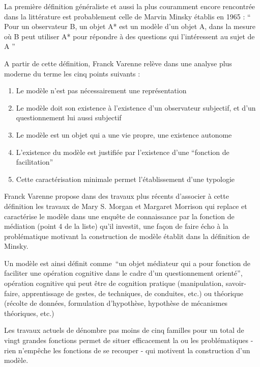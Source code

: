 La première définition généraliste et aussi la plus couramment encore rencontrée dans la littérature est probablement celle de Marvin Minsky établis en 1965 \autocite{Varenne2008} \autocite[15]{Varenne2013}  : \enquote{ Pour un observateur B, un objet A* est un modèle d’un objet A, dans la mesure où B peut utiliser A* pour répondre à des questions qui l’intéressent au sujet de A } \autocite{Minsky1965}

A partir de cette définition, Franck Varenne \autocite{Varenne2008} relève dans une analyse plus moderne du terme les cinq points suivants : 
\begin{enumerate}
  \item Le modèle n'est pas nécessairement une représentation
  \item Le modèle doit son existence à l'existence d'un observateur subjectif, et d'un questionnement lui aussi subjectif
  \item Le modèle est un objet qui a une vie propre, une existence autonome
  \item L'existence du modèle est justifiée par l'existence d'une \enquote{fonction de facilitation}
  \item Cette caractérisation minimale permet l'établissement d'une typologie
\end{enumerate}

Franck Varenne propose dans des travaux plus récents \autocite{Varenne2013} d'associer à cette définition les travaux de Mary S. Morgan et Margaret Morrison qui replace et caractérise le modèle dans une enquête de connaissance par la fonction de médiation (point 4 de la liste) qu'il investit, une façon de faire écho à la problématique motivant la construction de modèle établit dans la définition de Minsky.

Un modèle est ainsi définit comme \enquote{un objet médiateur qui a pour fonction de faciliter une opération cognitive dans le cadre d'un questionnement orienté}, opération cognitive qui peut être de cognition pratique (manipulation,  savoir-faire, apprentissage de gestes, de techniques, de conduites, etc.) ou théorique (récolte de données, formulation d'hypothèse, hypothèse de mécanismes théoriques, etc.) \autocite{Varenne2013}

Les travaux actuels de \textcite{Varenne2008, Varenne2013} dénombre pas moins de cinq familles pour un total de vingt grandes fonctions permet de situer efficacement la ou les problématiques - rien n’empêche les fonctions de se recouper - qui motivent la construction d'un modèle. 

